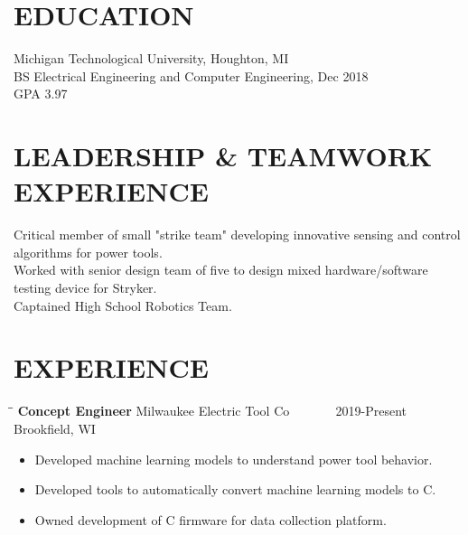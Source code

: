 \documentclass[letterpaper]{res}
\begin{document}
 


\address{\bf CONTACT \\ jaevanko@mtu.edu \\ (269) 262-6098}
\address{\bf ADDRESS \\ 405 Bishops Way, Apt 308 \\ Brookfield, WI 53005}

\begin{resume}


  \section{EDUCATION}          
  Michigan Technological University, Houghton, MI  \\        
  BS Electrical Engineering and Computer Engineering, Dec 2018   \\      
  GPA 3.97

  \section{LEADERSHIP \& TEAMWORK EXPERIENCE}
  Critical member of small "strike team" developing innovative sensing and control algorithms for power tools. \\
  Worked with senior design team of five to design mixed hardware/software testing device for Stryker. \\
  Captained High School Robotics Team. \\

  \section{EXPERIENCE}
  \vspace{-0.15in}
  \begin{tabbing}
    \hspace{2.3in}\= \hspace{2.6in}\= \kill %
    {\bf Concept Engineer} \>Milwaukee Electric Tool Co \> ~~~~~~ 2019-Present \\
    \> Brookfield, WI
  \end{tabbing}\vspace{-10pt}
  \begin{itemize} \itemsep1pt \parskip0pt 
    \item Developed machine learning models to understand power tool behavior.
    \item Developed tools to automatically convert machine learning models to C.
    \item Owned development of C firmware for data collection platform.
  \end{itemize}


\end{resume}
\end{document}
